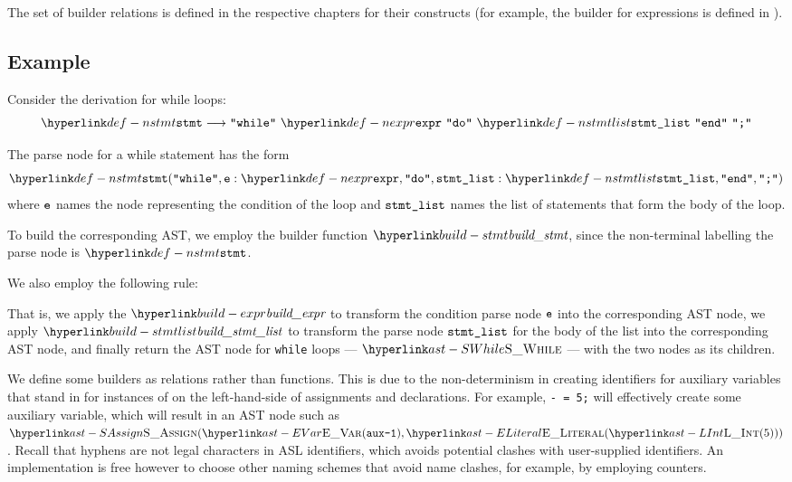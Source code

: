 The set of builder relations is defined in the respective chapters for their constructs
(for example, the builder for expressions is defined in ).

\subsection{Example}
Consider the derivation for while loops:
\[
\Nstmt \derives \Twhile \parsesep \Nexpr \parsesep \Tdo \parsesep \Nstmtlist \parsesep \Tend \parsesep \Tsemicolon
\]

The parse node for a while statement has the form
\[
\Nstmt(\Twhile, \namednode{\ve}{\Nexpr}, \Tdo, \namednode{\vstmtlist}{\Nstmtlist}, \Tend, \Tsemicolon)
\]
where $\texttt{e}$ names the node representing the condition of the loop and $\texttt{stmt\_list}$ names
the list of statements that form the body of the loop.

To build the corresponding AST, we employ the builder function $\buildstmt$, since
the non-terminal labelling the parse node is $\Nstmt$.

We also employ the following rule:
\begin{mathpar}
\end{mathpar}
That is, we apply the $\buildexpr$ to transform the condition parse node $\texttt{e}$ into the corresponding AST node,
we apply $\buildstmtlist$ to transform the parse node $\texttt{stmt\_list}$ for the body of the list into the corresponding AST node,
and finally return the AST node for \texttt{while} loops --- $\SWhile$ --- with the two nodes as its children.

We define some builders as relations rather than functions. This is due to the non-determinism
in creating identifiers for auxiliary variables that stand in for instances of \discardvar{} on the left-hand-side
of assignments and declarations.
For example, \texttt{- = 5;} will effectively create some auxiliary variable, which will result in
an AST node such as $\SAssign(\EVar(\texttt{aux-1}), \ELiteral(\LInt(5)))$.
Recall that hyphens are not legal characters in ASL identifiers, which avoids potential clashes with
user-supplied identifiers. An implementation is free however to choose other naming schemes that
avoid name clashes, for example, by employing counters.

